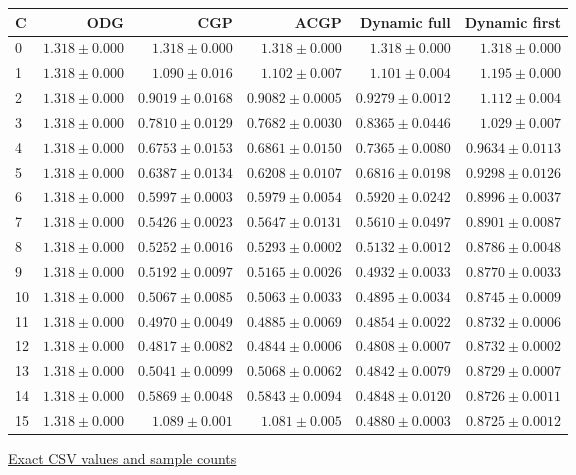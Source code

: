 \begin{center}{\scriptsize\setlength{\tabcolsep}{3pt}
\begin{tabular}{lrrrrr}
\toprule
C & ODG & CGP & ACGP & Dynamic full & Dynamic first \\
\midrule
0 & $1.318\pm0.000$ & $1.318\pm0.000$ & $1.318\pm0.000$ & $1.318\pm0.000$ & $1.318\pm0.000$ \\
1 & $1.318\pm0.000$ & $1.090\pm0.016$ & $1.102\pm0.007$ & $1.101\pm0.004$ & $1.195\pm0.000$ \\
2 & $1.318\pm0.000$ & $0.9019\pm0.0168$ & $0.9082\pm0.0005$ & $0.9279\pm0.0012$ & $1.112\pm0.004$ \\
3 & $1.318\pm0.000$ & $0.7810\pm0.0129$ & $0.7682\pm0.0030$ & $0.8365\pm0.0446$ & $1.029\pm0.007$ \\
4 & $1.318\pm0.000$ & $0.6753\pm0.0153$ & $0.6861\pm0.0150$ & $0.7365\pm0.0080$ & $0.9634\pm0.0113$ \\
5 & $1.318\pm0.000$ & $0.6387\pm0.0134$ & $0.6208\pm0.0107$ & $0.6816\pm0.0198$ & $0.9298\pm0.0126$ \\
6 & $1.318\pm0.000$ & $0.5997\pm0.0003$ & $0.5979\pm0.0054$ & $0.5920\pm0.0242$ & $0.8996\pm0.0037$ \\
7 & $1.318\pm0.000$ & $0.5426\pm0.0023$ & $0.5647\pm0.0131$ & $0.5610\pm0.0497$ & $0.8901\pm0.0087$ \\
8 & $1.318\pm0.000$ & $0.5252\pm0.0016$ & $0.5293\pm0.0002$ & $0.5132\pm0.0012$ & $0.8786\pm0.0048$ \\
9 & $1.318\pm0.000$ & $0.5192\pm0.0097$ & $0.5165\pm0.0026$ & $0.4932\pm0.0033$ & $0.8770\pm0.0033$ \\
10 & $1.318\pm0.000$ & $0.5067\pm0.0085$ & $0.5063\pm0.0033$ & $0.4895\pm0.0034$ & $0.8745\pm0.0009$ \\
11 & $1.318\pm0.000$ & $0.4970\pm0.0049$ & $0.4885\pm0.0069$ & $0.4854\pm0.0022$ & $0.8732\pm0.0006$ \\
12 & $1.318\pm0.000$ & $0.4817\pm0.0082$ & $0.4844\pm0.0006$ & $0.4808\pm0.0007$ & $0.8732\pm0.0002$ \\
13 & $1.318\pm0.000$ & $0.5041\pm0.0099$ & $0.5068\pm0.0062$ & $0.4842\pm0.0079$ & $0.8729\pm0.0007$ \\
14 & $1.318\pm0.000$ & $0.5869\pm0.0048$ & $0.5843\pm0.0094$ & $0.4848\pm0.0120$ & $0.8726\pm0.0011$ \\
15 & $1.318\pm0.000$ & $1.089\pm0.001$ & $1.081\pm0.005$ & $0.4880\pm0.0003$ & $0.8725\pm0.0012$ \\
\bottomrule\end{tabular}}
{\footnotesize\href{https://github.com/sanjeevkrishnaa/Compiler-Driven-ACE/blob/codex/ace-scheduler-correctness/docs/latex/qft96_final/data/allocation_mesh_yx_m16.csv}{Exact CSV values and sample counts}}
\end{center}
